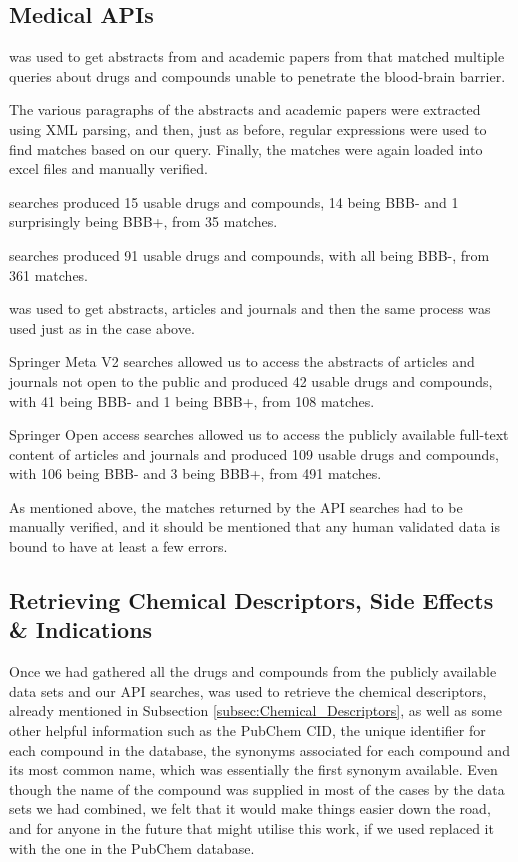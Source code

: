 \subsection{Medical APIs}

\citet{PubMedAPI} was used to get abstracts from \citet{PubMed} and academic papers from \citet{PubMed_Central} that matched multiple queries about drugs and compounds unable to penetrate the blood-brain barrier.

The various paragraphs of the abstracts and academic papers were extracted using XML parsing, and then, just as before, regular expressions were used to find matches based on our query. Finally, the matches were again loaded into excel files and manually verified.

\citet{PubMed} searches produced 15 usable drugs and compounds, 14 being BBB- and 1 surprisingly being BBB+, from 35 matches.

\citet{PubMed_Central} searches produced 91 usable drugs and compounds, with all being BBB-, from 361 matches.

\citet{SpringerAPI} was used to get abstracts, articles and journals and then the same process was used just as in the case above.

Springer Meta V2 searches allowed us to access the abstracts of articles and journals not open to the public and produced 42 usable drugs and compounds, with 41 being BBB- and 1 being BBB+, from 108 matches.

Springer Open access searches allowed us to access the publicly available full-text content of articles and journals and produced 109 usable drugs and compounds, with 106 being BBB- and 3 being BBB+, from 491 matches.

As mentioned above, the matches returned by the API searches had to be manually verified, and it should be mentioned that any human validated data is bound to have at least a few errors.

\subsection{Retrieving Chemical Descriptors, Side Effects \& Indications}

Once we had gathered all the drugs and compounds from the publicly available data sets and our API searches, \citet{PubChemAPI} was used to retrieve the chemical descriptors, already mentioned in Subsection \ref{subsec:Chemical_Descriptors}, as well as some other helpful information such as the PubChem CID, the unique identifier for each compound in the \citet{PubChem} database, the synonyms associated for each compound and its most common name, which was essentially the first synonym available. Even though the name of the compound was supplied in most of the cases by the data sets we had combined, we felt that it would make things easier down the road, and for anyone in the future that might utilise this work, if we used replaced it with the one in the PubChem database. 

